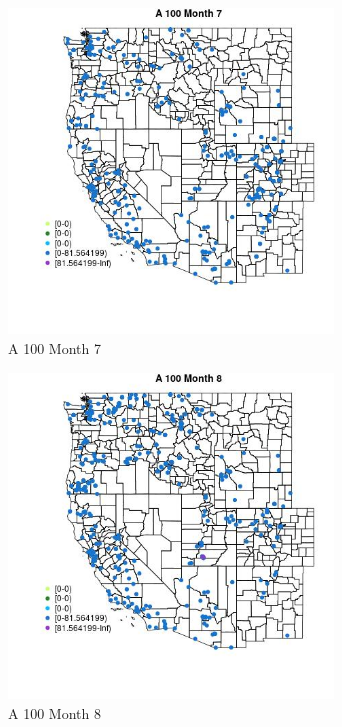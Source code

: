 \begin{figure} 
\centering  
\includegraphics[width=0.77\textwidth]{Code_Outputs/Report_ML_input_PM25_Step4_part_e_de_duplicated_aveswNAs_MapObsMo7A_100.jpg} 
\caption{\label{fig:Report_ML_input_PM25_Step4_part_e_de_duplicated_aveswNAsMapObsMo7A_100}A 100 Month 7} 
\end{figure} 
 

\clearpage 

\begin{figure} 
\centering  
\includegraphics[width=0.77\textwidth]{Code_Outputs/Report_ML_input_PM25_Step4_part_e_de_duplicated_aveswNAs_MapObsMo8A_100.jpg} 
\caption{\label{fig:Report_ML_input_PM25_Step4_part_e_de_duplicated_aveswNAsMapObsMo8A_100}A 100 Month 8} 
\end{figure} 
 

